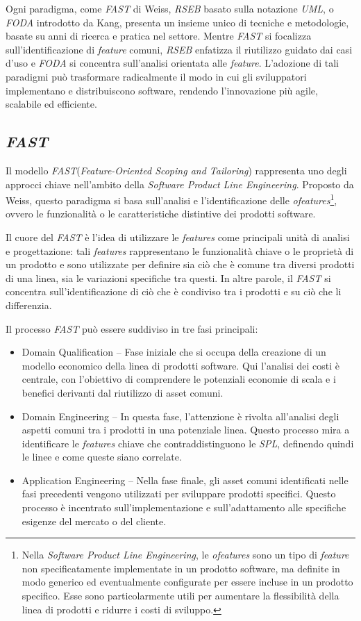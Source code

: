 \documentclass[12pt]{report}
\newcommand{\spl}{\textsl{SPL}\xspace}
\newcommand{\fast}{\textsl{FAST}\xspace}
\newcommand{\rseb}{\textsl{RSEB}\xspace}
\newcommand{\foda}{\textsl{FODA}\xspace}
\newcommand{\uml}{\textsl{UML}\xspace}
\begin{document}
Ogni paradigma, come \fast di Weiss, \rseb basato sulla notazione \uml, o \foda introdotto da Kang, presenta un insieme unico di tecniche e metodologie, basate su anni di ricerca e pratica nel settore. Mentre \fast si focalizza sull'identificazione di \textit{feature} comuni, \rseb enfatizza il riutilizzo guidato dai casi d'uso e \foda si concentra sull'analisi orientata alle \textit{feature}. L'adozione di tali paradigmi può trasformare radicalmente il modo in cui gli sviluppatori implementano e distribuiscono software, rendendo l'innovazione più agile, scalabile ed efficiente.


\subsection{\fast}
Il modello \fast (\textit{Feature-Oriented Scoping and Tailoring}) rappresenta uno degli approcci chiave nell'ambito della \textit{Software Product Line Engineering}. Proposto da Weiss, questo paradigma si basa sull'analisi e l'identificazione delle \textit{ofeatures}\footnote{Nella \textit{Software Product Line Engineering}, le \textit{ofeatures} sono un tipo di \textit{feature} non specificatamente implementate in un prodotto software, ma definite in modo generico ed eventualmente configurate per essere incluse in un prodotto specifico. Esse sono particolarmente utili per aumentare la flessibilità della linea di prodotti e ridurre i costi di sviluppo.}, ovvero le funzionalità o le caratteristiche distintive dei prodotti software.

Il cuore del \fast è l'idea di utilizzare le \textit{features} come principali unità di analisi e progettazione: tali \textit{features} rappresentano le funzionalità chiave o le proprietà di un prodotto e sono utilizzate per definire sia ciò che è comune tra diversi prodotti di una linea, sia le variazioni specifiche tra questi. In altre parole, il \fast si concentra sull'identificazione di ciò che è condiviso tra i prodotti e su ciò che li differenzia.

Il processo \fast può essere suddiviso in tre fasi principali:

\begin{itemize}
\item \textsf{Domain Qualification} -- Fase iniziale che si occupa della creazione di un modello economico della linea di prodotti software. Qui l'analisi dei costi è centrale, con l'obiettivo di comprendere le potenziali economie di scala e i benefici derivanti dal riutilizzo di asset comuni.
\item \textsf{Domain Engineering} -- In questa fase, l'attenzione è rivolta all'analisi degli aspetti comuni tra i prodotti in una potenziale linea. Questo processo mira a identificare le \textit{features} chiave che contraddistinguono le \spl, definendo quindi le linee e come queste siano correlate.
\item \textsf{Application Engineering} -- Nella fase finale, gli asset comuni identificati nelle fasi precedenti vengono utilizzati per sviluppare prodotti specifici. Questo processo è incentrato sull'implementazione e sull'adattamento alle specifiche esigenze del mercato o del cliente.
\end{itemize}
\end{document}
